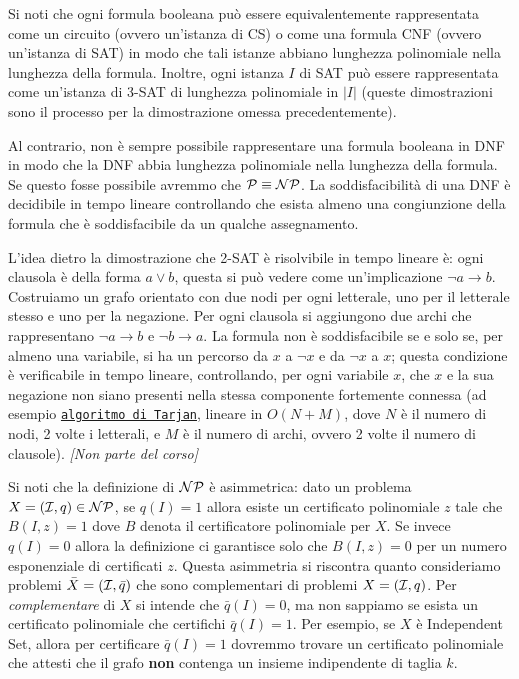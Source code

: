 Si noti che ogni formula booleana può essere equivalentemente rappresentata come un circuito (ovvero un'istanza di CS) o come una formula CNF (ovvero un'istanza di SAT) in modo che tali istanze abbiano lunghezza polinomiale nella lunghezza della formula. Inoltre, ogni istanza $I$ di SAT può essere rappresentata come un'istanza di 3-SAT di lunghezza polinomiale in $|I|$ (queste dimostrazioni sono il processo per la dimostrazione omessa precedentemente).

Al contrario, non è sempre possibile rappresentare una formula booleana in DNF in modo che la DNF abbia lunghezza polinomiale nella lunghezza della formula. Se questo fosse possibile avremmo che $\mathcal{P} \equiv \mathcal{NP}$. La soddisfacibilità di una DNF è decidibile in tempo lineare controllando che esista almeno una congiunzione della formula che è soddisfacibile da un qualche assegnamento.

L'idea dietro la dimostrazione che 2-SAT è risolvibile in tempo lineare è: ogni clausola è della forma $a \vee b$, questa si può vedere come un'implicazione $\neg a \rightarrow b$. Costruiamo un grafo orientato con due nodi per ogni letterale, uno per il letterale stesso e uno per la negazione. Per ogni clausola si aggiungono due archi che rappresentano $\neg a \rightarrow b$ e $\neg b \rightarrow a$. La formula non è soddisfacibile se e solo se, per almeno una variabile, si ha un percorso da $x$ a  $\neg x$ e da $\neg x$ a $x$; questa condizione è verificabile in tempo lineare, controllando, per ogni variabile $x$, che $x$ e la sua negazione non siano presenti nella stessa componente fortemente connessa (ad esempio \href{https://it.wikipedia.org/wiki/Algoritmo_di_Tarjan_per_le_componenti_fortemente_connesse}{\texttt{algoritmo di Tarjan}}, lineare in $O(N + M)$, dove $N$ è il numero di nodi, 2 volte i letterali, e $M$ è il numero di archi, ovvero 2 volte il numero di clausole). \textit{[Non parte del corso]}

Si noti che la definizione di $\mathcal{NP}$ è asimmetrica: dato un problema $X = (\mathcal{I}, q) \in \mathcal{NP}$, se $q(I) = 1$ allora esiste un certificato polinomiale $z$ tale che $B(I, z) = 1$ dove $B$ denota il certificatore polinomiale per $X$. Se invece $q(I) = 0$ allora la definizione ci garantisce solo che $B(I,z) = 0$ per un numero esponenziale di certificati $z$. Questa asimmetria si riscontra quanto consideriamo problemi $\bar X = (\mathcal{I}, \bar q)$ che sono complementari di problemi $X = (\mathcal{I}, q)$. Per \textit{complementare} di $X$ si intende che $\bar q(I) = 0$, ma non sappiamo se esista un certificato polinomiale che certifichi $\bar q (I) = 1$. Per esempio, se $X$ è Independent Set, allora per certificare $\bar q(I) = 1$ dovremmo trovare un certificato polinomiale che attesti che il grafo \textbf{non} contenga un insieme indipendente di taglia $k$.

